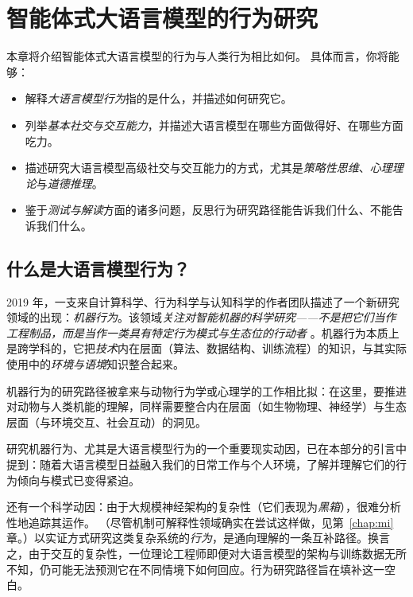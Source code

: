 

\chapter{智能体式大语言模型的行为研究}\label{chap:behavior}

\begin{learningbox}
本章将介绍智能体式大语言模型的行为与人类行为相比如何。%
具体而言，你将能够：
\begin{itemize}[leftmargin=*, nosep]
    \item 解释{\em 大语言模型行为}指的是什么，并描述如何研究它。
    \item 列举{\em 基本社交与交互能力}，并描述大语言模型在哪些方面做得好、在哪些方面吃力。
    \item 描述研究大语言模型高级社交与交互能力的方式，尤其是{\em 策略性思维}、{\em 心理理论}与{\em 道德推理}。
    \item 鉴于{\em 测试与解读}方面的诸多问题，反思行为研究路径能告诉我们什么、不能告诉我们什么。
\end{itemize}
\end{learningbox}

\section{什么是大语言模型行为？}
2019 年，一支来自计算科学、行为科学与认知科学的作者团队描述了一个新研究领域的出现：\emph{机器行为}。该领域{\em 关注对智能机器的科学研究——不是把它们当作工程制品，而是当作一类具有特定行为模式与生态位的行动者} \citep{rahwan_machine_2019}。机器行为本质上是跨学科的，它把{\em 技术}内在层面（算法、数据结构、训练流程）的知识，与其实际使用中的\emph{环境与语境}知识整合起来。

机器行为的研究路径被拿来与动物行为学或心理学的工作相比拟：在这里，要推进对动物与人类机能的理解，同样需要整合内在层面（如生物物理、神经学）与生态层面（与环境交互、社会互动）的洞见。

研究机器行为、尤其是大语言模型行为的一个重要现实动因，已在本部分的引言中提到：随着大语言模型日益融入我们的日常工作与个人环境，了解并理解它们的行为倾向与模式已变得紧迫。

还有一个科学动因：由于大规模神经架构的复杂性（它们表现为{\em 黑箱}），很难分析性地追踪其运作。
（尽管机制可解释性领域确实在尝试这样做，见第~\ref{chap:mi} 章。）以实证方式研究这类复杂系统的{\em 行为}，是通向理解的一条互补路径。换言之，由于交互的复杂性，一位理论工程师即便对大语言模型的架构与训练数据无所不知，仍可能无法预测它在不同情境下如何回应。行为研究路径旨在填补这一空白。


